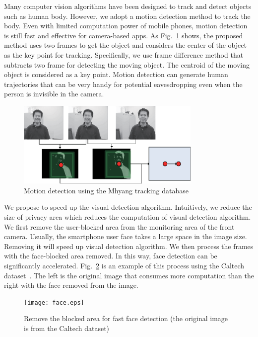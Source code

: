 Many computer vision algorithms have been designed to track and detect objects such as human body\cite{felzenszwalb2008discriminatively}\cite{wang2009hog}.  However, we adopt a motion detection method to track the body. Even with limited  computation power of mobile phones, motion detection  is still fast and effective for  camera-based apps. As Fig.~\ref{fig:motion} shows, the proposed method uses two frames to get the object and considers the center of the object as the key point for tracking.  Specifically, we use frame difference method \cite{lee2009vision} that subtracts two frame for detecting the moving object. The centroid of the moving object is considered as a key point.  %
 Motion detection  can generate human trajectories  that can be very handy for potential eavesdropping even when the person is invisible in the camera.
\begin{figure}[H]
\centering
\includegraphics[width=3.5in]{motion.eps}
\caption{Motion detection using the Mhyang tracking database}
\label{fig:motion}
\end{figure}


 We propose to speed up the visual detection algorithm.  Intuitively, we reduce the size of privacy area which reduces the computation of visual detection algorithm. We first remove the user-blocked area from the monitoring area of the front camera.
Usually, the smartphone user face takes a large space in the image size. Removing it will speed up  visual detection algorithm.
We then process the frames with the face-blocked area removed. In this way,  face detection can be significantly accelerated. Fig.~\ref{fig:remove} is an example of this process using the Caltech dataset~\cite{jesorsky2001robust}.
The left is the original image that consumes more computation than the right  with the face removed from the image.
\begin{figure}[H]
\centering
\texttt{[image: face.eps]}
\caption{Remove the blocked area for fast face detection (the original image is from the Caltech dataset)}
\label{fig:remove}
\end{figure}

